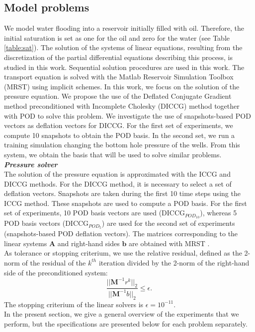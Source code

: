 \documentclass[12pt]{article}
\begin{document}
\subsection{Model problems}\label{modpro}
\hspace{0.5cm} We model water flooding into a reservoir initially filled with oil. Therefore, the initial saturation is set as one for the oil and zero for the water (see Table \ref{table:sat}). 
The solution of the systems of linear equations, resulting from the discretization of the partial differential equations describing this process, is studied in this work. Sequential solution procedures are used in this work. The transport equation is solved with the Matlab Reservoir Simulation Toolbox (MRST) \cite{Lie13} using implicit schemes.
In this work, we focus on the solution of the pressure equation. We propose the use of the Deflated Conjugate Gradient method preconditioned with Incomplete Cholesky (DICCG) method together with POD to solve this problem. We investigate the use of snapshots-based POD vectors as deflation vectors for DICCG. For the first set of experiments, we compute 10 snapshots to obtain the POD basis. In the second set, we run a training simulation changing the bottom hole pressure of the wells. From this system, we obtain the basis that will be used to solve similar problems.\\
\emph{\textbf{Pressure solver}}\\
The solution of the pressure equation is approximated with the ICCG and DICCG methods. 
For the DICCG method, it is necessary to select a set of deflation vectors. Snapshots are taken during the first 10 time steps using the ICCG method. These snapshots are used to compute a POD basis. For the first set of experiments, 10 POD basis vectors are used (DICCG$_{POD_{10}}$), whereas 5 POD basis vectors (DICCG$_{POD_{5}}$) are used for the second set of experiments (snapshots-based POD deflation vectors). The matrices corresponding to the linear systems $\mathbf{A}$ and right-hand sides $\mathbf{b}$ are obtained with MRST \cite{Lie13}. \\
As tolerance or stopping criterium, we use the relative residual, defined as the 2-norm of the residual of the $k^{th}$ iteration divided by 
the 2-norm of the right-hand side of the preconditioned system: 
$$\frac{||\mathbf{M}^{-1}r^k||_2}{||\mathbf{M}^{-1}b||_2}\leq \epsilon.$$
The stopping criterium of the linear solvers is $\epsilon=10^{-11}$. \\
In the present section, we give a general overview of the experiments that we perform, but the specifications are presented below for each problem separately. 
\end{document}
